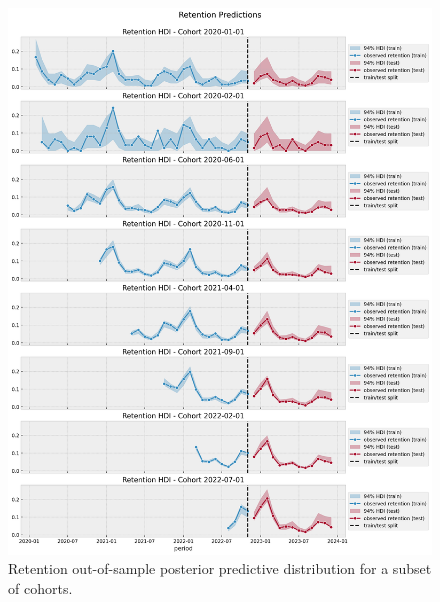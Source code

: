 \documentclass[11pt]{amsart}
\theoremstyle{definition}
\begin{document}
\begin{figure}
    \centering
    \includegraphics[width=\textwidth]{images/revenue_retention_66_0.png}
    \caption{Retention out-of-sample posterior predictive distribution for a subset of
    cohorts.}
    \label{fig:out_sample_retention}
\end{figure}
\end{document}
